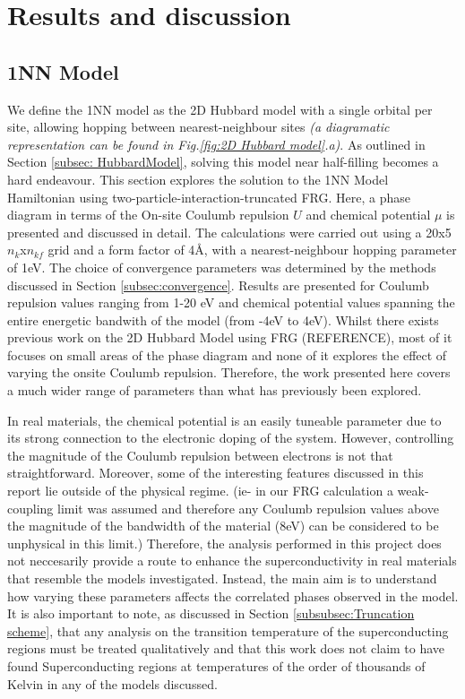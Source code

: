 \documentclass[12pt]{article}
\begin{document}
\section{Results and discussion}

\subsection{1NN Model}
\label{subsec:1NNModel}

We define the 1NN model as the 2D Hubbard model with a single orbital per site,  allowing hopping between nearest-neighbour sites \textit{(a diagramatic representation can be found in Fig.\ref{fig:2D Hubbard model}.a)}. 
As outlined in Section \ref{subsec: HubbardModel}, solving this model near half-filling becomes a hard endeavour. 
This section explores the solution to the 1NN Model Hamiltonian using  two-particle-interaction-truncated FRG.
Here, a phase diagram in terms of the On-site Coulumb repulsion $U$ and chemical
potential $\mu$ is presented and discussed in detail. The calculations were carried out using a 20x5 $n_k$x$n_{kf}$ grid and a form factor
of 4\AA, with a  nearest-neighbour hopping parameter of 1eV.  The choice of convergence parameters was determined by the methods discussed in Section \ref{subsec:convergence}. 
Results are presented for Coulumb repulsion values  ranging from 1-20 eV and chemical potential
values spanning the entire energetic bandwith of the model (from -4eV to 4eV). 
Whilst there exists previous work on the 2D Hubbard Model using FRG (REFERENCE), most of it focuses on small areas of the phase diagram and none of it explores the effect of varying the 
onsite Coulumb repulsion. Therefore, the work presented here covers a much wider range of parameters than what has previously been explored. 
\medskip




\noindent In real materials,  the chemical potential is an easily tuneable parameter due to its strong connection to the electronic doping of the system.
However, controlling the magnitude of the Coulumb repulsion between electrons is not that straightforward. 
Moreover, some of the interesting features discussed in this report lie outside of the physical regime. (ie- in our FRG calculation a weak-coupling limit was 
assumed and therefore any Coulumb repulsion values above the magnitude of the  bandwidth of the material (8eV) can be considered to be unphysical in this limit.)
Therefore, the analysis performed in this project does not neccesarily provide a route to enhance the superconductivity in real materials that resemble the models investigated. Instead, the main aim is to understand how varying these parameters affects the correlated phases observed in the model. It is also important to note, as discussed in Section \ref{subsubsec:Truncation scheme}, that any analysis on the transition temperature
of the superconducting regions must be treated qualitatively and that this work does not claim to have found Superconducting regions at temperatures of the order of thousands of Kelvin in any of the models discussed. \par 
\end{document}
